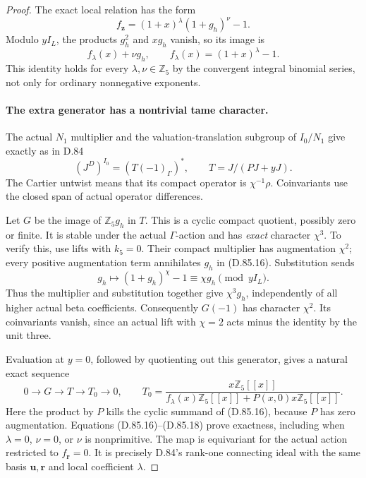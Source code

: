 \begin{proof}
The exact local relation has the form
\[
 f_{\mathbf z}=(1+x)^\lambda(1+g_h)^\nu-1.
                                                               \tag{D.85.17}
\]
Modulo \(yI_L\), the products \(g_h^2\) and \(xg_h\)
vanish, so its image is
\[
                 f_\lambda(x)+\nu g_h,
 \qquad f_\lambda(x)=(1+x)^\lambda-1.
                                                               \tag{D.85.18}
\]
This identity holds for every \(\lambda,\nu\in\mathbb Z_5\)
by the convergent integral binomial series, not only for
ordinary nonnegative exponents.

\paragraph{The extra generator has a nontrivial tame character.}
The actual \(N_1\) multiplier and the valuation-translation
subgroup of \(I_0/N_1\) give exactly as in D.84
\[
 (J^D)^{I_0}=(T(-1)_\Gamma)^*,
 \qquad T=J/(PJ+yJ).
                                                               \tag{D.85.19}
\]
The Cartier untwist means that its compact operator is
\(\chi^{-1}\rho\). Coinvariants use the closed span of
actual operator differences.

Let \(G\) be the image of \(\mathbb Z_5g_h\) in \(T\).
This is a cyclic compact quotient, possibly zero or finite.
It is stable under the actual \(\Gamma\)-action and has
\emph{exact} character \(\chi^3\). To verify this, use
lifts with \(k_5=0\). Their compact multiplier has
augmentation \(\chi^2\); every positive augmentation term
annihilates \(g_h\) in (D.85.16). Substitution sends
\[
 g_h\longmapsto (1+g_h)^\chi-1\equiv\chi g_h
                                      \pmod{yI_L}.
\]
Thus the multiplier and substitution together give
\(\chi^3g_h\), independently of all higher actual beta
coefficients. Consequently \(G(-1)\) has character
\(\chi^2\). Its coinvariants vanish, since an actual lift
with \(\chi=2\) acts minus the identity by the unit three.

Evaluation at \(y=0\), followed by quotienting out this
generator, gives a natural exact sequence
\[
 0\longrightarrow G\longrightarrow T\longrightarrow T_0
                       \longrightarrow0,
 \qquad
 T_0=\frac{x\mathbb Z_5[[x]]}
 {f_\lambda(x)\mathbb Z_5[[x]]+
                        P(x,0)x\mathbb Z_5[[x]]}.
                                                               \tag{D.85.20}
\]
Here the product by \(P\) kills the cyclic summand of
(D.85.16), because \(P\) has zero augmentation. Equations
(D.85.16)--(D.85.18) prove exactness, including when
\(\lambda=0\), \(\nu=0\), or \(\nu\) is nonprimitive.
The map is equivariant for the actual action restricted to
\(f_{\mathbf r}=0\). It is precisely D.84's rank-one
connecting ideal with the same basis \(\mathbf u,\mathbf r\)
and local coefficient \(\lambda\).


\end{proof}
